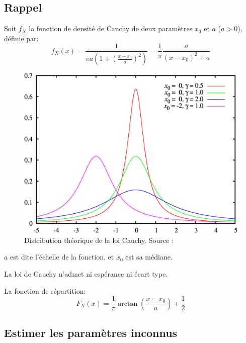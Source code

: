 \documentclass[12pt,a4paper,titlepage]{article}
\numberwithin{equation}{section}
\begin{document}
\subsection{Rappel}
Soit $f_X$ la fonction de densité de Cauchy de deux paramètres $x_0$ et $a$ ($a>0$), définie par:
\begin{equation}
\label{dCauchy}
{f_X}\left( x \right) = \frac{1}{{\pi a\left( {1 + {{\left( {\frac{{x - {x_0}}}{a}} \right)}^2}} \right)}} = \frac{1}{\pi }\frac{a}{{{{\left( {x - {x_0}} \right)}^2} + a}}
\end{equation}

\begin{figure}[h]
\includegraphics[width=\linewidth]{images/Cauchy_distribution_theoretic.png}
\caption{Distribution théorique de la loi Cauchy. Source : \cite{WikiLoiCauchy}}
\end{figure}

$a$ est dite l'échelle de la fonction, et $x_0$ est sa médiane.

La loi de Cauchy n'admet ni espérance ni écart type.

La fonction de répartition:
\begin{equation}
\label{rCauchy}
{F_X}\left( x \right) = \frac{1}{\pi }\arctan \left( {\frac{{x - {x_0}}}{a}} \right) + \frac{1}{2}
\end{equation}

\subsection{Estimer les paramètres inconnus}
\end{document}
